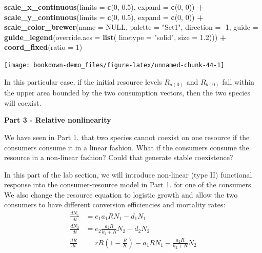 \documentclass[
]{book}
\newenvironment{Shaded}{\begin{snugshade}}{\end{snugshade}}
\newcommand{\DataTypeTok}[1]{\textcolor[rgb]{0.13,0.29,0.53}{#1}}
\newcommand{\DecValTok}[1]{\textcolor[rgb]{0.00,0.00,0.81}{#1}}
\newcommand{\FloatTok}[1]{\textcolor[rgb]{0.00,0.00,0.81}{#1}}
\newcommand{\KeywordTok}[1]{\textcolor[rgb]{0.13,0.29,0.53}{\textbf{#1}}}
\newcommand{\NormalTok}[1]{#1}
\newcommand{\OperatorTok}[1]{\textcolor[rgb]{0.81,0.36,0.00}{\textbf{#1}}}
\newcommand{\OtherTok}[1]{\textcolor[rgb]{0.56,0.35,0.01}{#1}}
\newcommand{\StringTok}[1]{\textcolor[rgb]{0.31,0.60,0.02}{#1}}
\begin{document}
\begin{Shaded}
\begin{Highlighting}[]
\StringTok{  }\KeywordTok{scale_x_continuous}\NormalTok{(}\DataTypeTok{limits =} \KeywordTok{c}\NormalTok{(}\DecValTok{0}\NormalTok{, }\FloatTok{0.5}\NormalTok{), }\DataTypeTok{expand =} \KeywordTok{c}\NormalTok{(}\DecValTok{0}\NormalTok{, }\DecValTok{0}\NormalTok{)) }\OperatorTok{+}
\StringTok{  }\KeywordTok{scale_y_continuous}\NormalTok{(}\DataTypeTok{limits =} \KeywordTok{c}\NormalTok{(}\DecValTok{0}\NormalTok{, }\FloatTok{0.5}\NormalTok{), }\DataTypeTok{expand =} \KeywordTok{c}\NormalTok{(}\DecValTok{0}\NormalTok{, }\DecValTok{0}\NormalTok{)) }\OperatorTok{+}
\StringTok{  }\KeywordTok{scale_color_brewer}\NormalTok{(}\DataTypeTok{name =} \OtherTok{NULL}\NormalTok{, }\DataTypeTok{palette =} \StringTok{"Set1"}\NormalTok{, }\DataTypeTok{direction =} \DecValTok{-1}\NormalTok{,}
                     \DataTypeTok{guide =} \KeywordTok{guide_legend}\NormalTok{(}\DataTypeTok{override.aes =} \KeywordTok{list}\NormalTok{(}
                       \DataTypeTok{linetype =} \StringTok{"solid"}\NormalTok{, }\DataTypeTok{size =} \FloatTok{1.2}\NormalTok{))) }\OperatorTok{+}
\StringTok{  }\KeywordTok{coord_fixed}\NormalTok{(}\DataTypeTok{ratio =} \DecValTok{1}\NormalTok{)}
\end{Highlighting}
\end{Shaded}

\begin{center}\texttt{[image: bookdown-demo\_files/figure-latex/unnamed-chunk-44-1]} \end{center}

In this particular case, if the initial resource levels \(R_{a(0)}\) and \(R_{b(0)}\) fall within the upper area bounded by the two consumption vectors, then the two species will coexist.

\textbf{Part 3 - Relative nonlinearity}

We have seen in Part 1. that two species cannot coexist on one resource if the consumers consume it in a linear fashion. What if the consumers consume the resource in a non-linear fashion? Could that generate stable coexistence?

In this part of the lab section, we will introduce non-linear (type II) functional response into the consumer-resource model in Part 1. for one of the consumers. We also change the resource equation to logistic growth and allow the two consumers to have different conversion efficiencies and mortality rates:
\begin{align*}
\frac {dN_{1}}{dt} &= e_{1}a_{1}RN_{1}-d_{1}N_{1}\\
\frac {dN_{2}}{dt} &= e_{2}\frac{a_{2}R}{k_{2}+R}N_{2}-d_{2}N_{2}\\
\frac {dR}{dt} &= rR(1-\frac{R}{K})-a_{1}RN_{1}-\frac{a_{2}R}{k_{2}+R}N_{2}\\
\end{align*}
\end{document}

